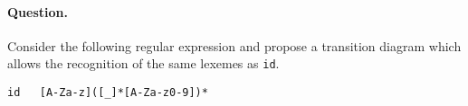 \paragraph{Question.} Consider the following \Lex regular expression
and propose a transition diagram which allows the recognition of the
same lexemes as \verb|id|. 
{\small
\begin{verbatim}
id   [A-Za-z]([_]*[A-Za-z0-9])*
\end{verbatim}
} 
